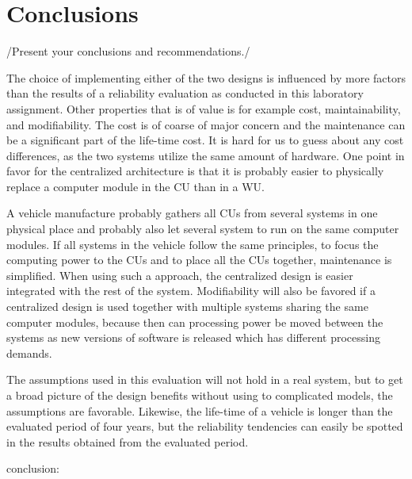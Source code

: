\newpage
\section{Conclusions}
\label{S6}
/{Present your conclusions and recommendations.}/\cite{sharpe}\cite{gnuplot}

The choice of implementing either of the two designs is influenced by more factors than the results of a reliability evaluation as conducted in this laboratory assignment. Other properties that is of value is for example cost, maintainability, and modifiability. The cost is of coarse of major concern and the maintenance can be a significant part of the life-time cost. It is hard for us to guess about any cost differences, as the two systems utilize the same amount of hardware. One point in favor for the centralized architecture is that it is probably easier to physically replace a computer module in the CU than in a WU. 

A vehicle manufacture probably gathers all CUs from several systems in one physical place and probably also let several system to run on the same computer modules. If all systems in the vehicle follow the same principles, to focus the computing power to the CUs and to place all the CUs together, maintenance is simplified. When using such a approach, the centralized design is easier integrated with the rest of the system. Modifiability will also be favored if a centralized design is used together with multiple systems sharing the same computer modules, because then can processing power be moved between the systems as new versions of software is released which has different processing demands. %

The assumptions used in this evaluation will not hold in a real system, but to get a broad picture of the design benefits without using to complicated models, the assumptions are favorable. Likewise, the life-time of a vehicle is longer than the evaluated period of four years, but the reliability tendencies can easily be spotted in the results obtained from the evaluated period.


conclusion:


